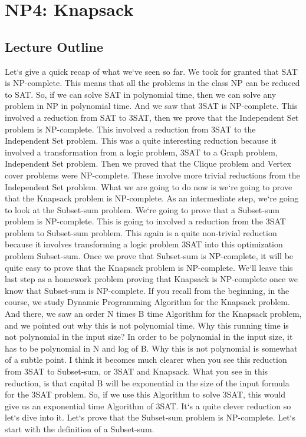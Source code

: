 \section{NP4: Knapsack}

\subsection{Lecture Outline}
Let`s give a quick recap of what we`ve seen so far.
We took for granted that SAT is NP-complete.
This means that all the problems in the class NP can be reduced to SAT\@.
So, if we can solve SAT in polynomial time, then we can solve any problem in NP in polynomial time.
And we saw that 3SAT is NP-complete.
This involved a reduction from SAT to 3SAT, then we prove that the Independent Set problem is NP-complete.
This involved a reduction from 3SAT to the Independent Set problem.
This was a quite interesting reduction because it involved a transformation from a logic problem, 3SAT to a Graph problem, Independent Set problem.
Then we proved that the Clique problem and Vertex cover problems were NP-complete.
These involve more trivial reductions from the Independent Set problem.
What we are going to do now is we`re going to prove that the Knapsack problem is NP-complete.
As an intermediate step, we`re going to look at the Subset-sum problem.
We`re going to prove that a Subset-sum problem is NP-complete.
This is going to involved a reduction from the 3SAT problem to Subset-sum problem.
This again is a quite non-trivial reduction because it involves transforming a logic problem 3SAT into this optimization problem Subset-sum.
Once we prove that Subset-sum is NP-complete, it will be quite easy to prove that the Knapsack problem is NP-complete.
We`ll leave this last step as a homework problem proving that Knapsack is NP-complete once we know that Subset-sum is NP-complete.
If you recall from the beginning, in the course, we study Dynamic Programming Algorithm for the Knapsack problem.
And there, we saw an order N times B time Algorithm for the Knapsack problem, and we pointed out why this is not polynomial time.
Why this running time is not polynomial in the input size? In order to be polynomial in the input size, it has to be polynomial in N and log of B\@.
Why this is not polynomial is somewhat of a subtle point.
I think it becomes much clearer when you see this reduction from 3SAT to Subset-sum, or 3SAT and Knapsack.
What you see in this reduction, is that capital B will be exponential in the size of the input formula for the 3SAT problem.
So, if we use this Algorithm to solve 3SAT, this would give us an exponential time Algorithm of 3SAT\@.
It`s a quite clever reduction so let`s dive into it.
Let`s prove that the Subset-sum problem is NP-complete.
Let`s start with the definition of a Subset-sum.

